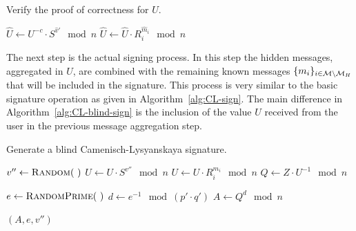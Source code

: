 \begin{algorithm}[t]
  \caption{Verify the proof of correctness for $U$.}
  \label{alg:CL-verify-U}
  \addtolength{\baselineskip}{1mm}
  \begin{algorithmic}[1]

      \State $\hat{U} \gets U^{-c} \cdot S^{\hat{v}'} \mod n$
        \State $\hat{U} \gets \hat{U} \cdot R_i^{\hat{m}_i} \mod n$
      \EndFor
        \Return {}
      \EndIf

      \Return {}
    \EndFunction
  \end{algorithmic}
\end{algorithm}

The next step is the actual signing process. In this step the hidden messages,
aggregated in $U$, are combined with the remaining known messages
$\{m_i\}_{i \in \mathcal{M} \setminus \mathcal{M}_H}$ that will be included in the signature.
This process is very similar to the basic signature operation as given in
Algorithm~\ref{alg:CL-sign}. The main difference in
Algorithm~\ref{alg:CL-blind-sign} is the inclusion of the value $U$ received
from the user in the previous message aggregation step.

\begin{algorithm}
  \caption{Generate a blind Camenisch-Lysyanskaya signature.}
  \label{alg:CL-blind-sign}
  \addtolength{\baselineskip}{1mm}
  \begin{algorithmic}[1]

      \State $v'' \gets \Call{Random}{~}$
      \State $U \gets U \cdot S^{v''} \mod n$
        \State $U \gets U \cdot R_i^{m_i} \mod n$
      \EndFor
      \State $Q \gets Z \cdot U^{-1} \mod n$

      \State $e \gets \Call{RandomPrime}{~}$
      \State $d \gets e^{-1} \mod (p' \cdot q')$
      \State $A \gets Q^d \mod n$

      \Return $(A, e, v'')$
    \EndFunction
  \end{algorithmic}
\end{algorithm}

